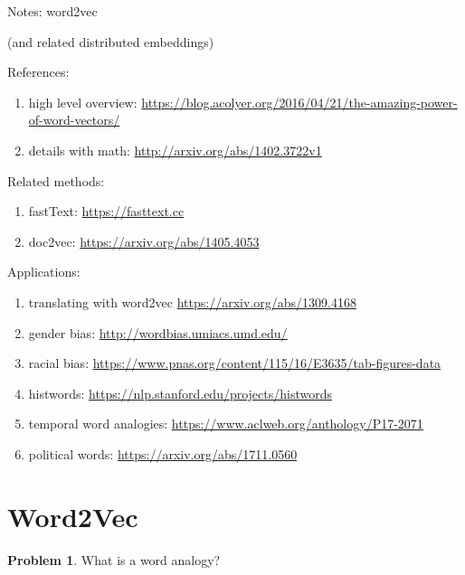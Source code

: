\documentclass[10pt]{article}
\theoremstyle{definition}
\newtheorem{problem}{Problem}
\begin{document}
\begin{center}
\Huge
Notes: word2vec 

\Large
\noindent
    (and related distributed embeddings)
\end{center}


\noindent
References:

\begin{enumerate}
    \item high level overview: \url{https://blog.acolyer.org/2016/04/21/the-amazing-power-of-word-vectors/}
    \item details with math: \url{http://arxiv.org/abs/1402.3722v1}
\end{enumerate}

\noindent
Related methods:

\begin{enumerate}
    \item fastText: \url{https://fasttext.cc}
    \item doc2vec: \url{https://arxiv.org/abs/1405.4053}
\end{enumerate}

\noindent
Applications:

\begin{enumerate}
    \item translating with word2vec \url{https://arxiv.org/abs/1309.4168}
    \item gender bias: \url{http://wordbias.umiacs.umd.edu/}
    \item racial bias: \url{https://www.pnas.org/content/115/16/E3635/tab-figures-data}
    \item histwords: \url{https://nlp.stanford.edu/projects/histwords}
    \item temporal word analogies: \url{https://www.aclweb.org/anthology/P17-2071}
    \item political words: \url{https://arxiv.org/abs/1711.0560}
\end{enumerate}


\section{Word2Vec}
\begin{problem}
    What is a word analogy?
\end{problem}
\vspace{3in}
\end{document}
